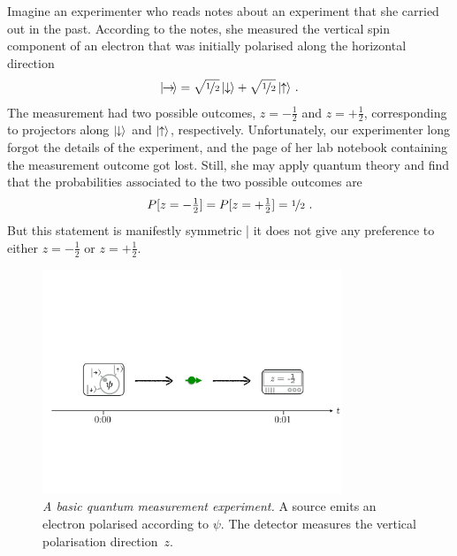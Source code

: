 \documentclass[12pt]{article}
\theoremstyle{plain}
\theoremstyle{definition}
\newcommand*{\ket}[1]{{| #1 \rangle}}
\newcommand*{\spinup}{\ket{{\hspace{-0.1ex}\uparrow\hspace{-0.1ex}}}}
\newcommand*{\spindown}{\ket{{\hspace{-0.1ex}\downarrow\hspace{-0.1ex}}}}
\newcommand*{\spinright}{\ket{{\hspace{-0.2ex}\rightarrow\hspace{-0.4ex}}}}
\newcommand*{\sminus}{{\textstyle - \frac{1}{2}}}
\newcommand*{\splus}{{\textstyle + \frac{1}{2}}}
\begin{document}
Imagine an experimenter who reads notes about an experiment that she carried out in the past. According to the notes, she measured the vertical spin component of an electron that was initially polarised along the horizontal direction
\begin{align*}
  \spinright = \sqrt{\nicefrac{1}{2}} \, \spindown + \sqrt{\nicefrac{1}{2}} \, \spinup  \ .
\end{align*}
The measurement had two possible outcomes, $z = \sminus$ and $z = \splus$, corresponding to projectors along $\spindown$ and $\spinup$, respectively. Unfortunately, our experimenter long forgot the details of the experiment, and the page of her lab notebook containing the measurement outcome got lost. Still, she may apply quantum theory and find that the probabilities associated to the two possible outcomes are
\begin{align} \label{eq_probstatement}
  P[z = \sminus] = P[z = \splus] = \nicefrac{1}{2} \ .
\end{align}
But this statement is manifestly symmetric | it does not give any preference to either $z = \sminus$ or $z = \splus$. 

\begin{figure}[t]
\centering
\includegraphics[trim= 0.4cm  8.6cm 0cm 11cm, clip=true, width=0.8\textwidth]{BasicMeasurement.pdf}
\caption{\emph{A basic quantum measurement experiment.} A  source emits an electron polarised according to $\psi$. The detector measures the vertical polarisation direction~$z$.
\label{fig_basicmeasurement}
}
\end{figure}
\end{document}
